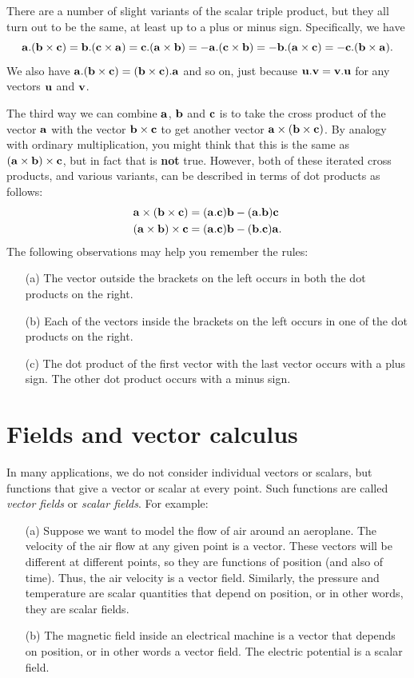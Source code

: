 \documentclass[reqno]{amsart}
\theoremstyle{definition}
\begin{document}
There are a number of slight variants of the scalar triple product,
but they all turn out to be the same, at least up to a plus or minus
sign.  Specifically, we have
\[ \mathbf{a}.(\mathbf{b}\times\mathbf{c}) = \mathbf{b}.(\mathbf{c}\times\mathbf{a}) = \mathbf{c}.(\mathbf{a}\times\mathbf{b}) = 
    -\mathbf{a}.(\mathbf{c}\times\mathbf{b}) = -\mathbf{b}.(\mathbf{a}\times\mathbf{c}) = -\mathbf{c}.(\mathbf{b}\times\mathbf{a}).
\]
We also have $\mathbf{a}.(\mathbf{b}\times\mathbf{c})=(\mathbf{b}\times\mathbf{c}).\mathbf{a}$ and so on, just because
$\mathbf{u}.\mathbf{v}=\mathbf{v}.\mathbf{u}$ for any vectors $\mathbf{u}$ and $\mathbf{v}$.

The third way we can combine $\mathbf{a}$, $\mathbf{b}$ and $\mathbf{c}$ is to take the
cross product of the vector $\mathbf{a}$ with the vector $\mathbf{b}\times\mathbf{c}$ to get
another vector $\mathbf{a}\times(\mathbf{b}\times\mathbf{c})$.  By analogy with ordinary
multiplication, you might think that this is the same as
$(\mathbf{a}\times\mathbf{b})\times\mathbf{c}$, but in fact that is \textbf{not} true.  However,
both of these iterated cross products, and various variants, can be
described in terms of dot products as follows:
\begin{align*}
 \mathbf{a}\times(\mathbf{b}\times\mathbf{c}) &= (\mathbf{a}.\mathbf{c})\mathbf{b} - (\mathbf{a}.\mathbf{b})\mathbf{c} \\
 (\mathbf{a}\times\mathbf{b})\times\mathbf{c} &= (\mathbf{a}.\mathbf{c})\mathbf{b} - (\mathbf{b}.\mathbf{c})\mathbf{a}.
\end{align*}
The following observations may help you remember the rules:
\begin{itemize}
 \item[(a)] The vector outside the brackets on the left occurs in both
  the dot products on the right.
 \item[(b)] Each of the vectors inside the brackets on the left occurs
  in one of the dot products on the right.
 \item[(c)] The dot product of the first vector with the last vector
  occurs with a plus sign.  The other dot product occurs with a minus
  sign. 
\end{itemize}

\section{Fields and vector calculus}
\label{sec-fields}

In many applications, we do not consider individual vectors or
scalars, but functions that give a vector or scalar at every point.
Such functions are called \emph{vector fields} or \emph{scalar
 fields}.  For example: 
\begin{itemize}
 \item[(a)] Suppose we want to model the flow of air around an
  aeroplane.  The velocity of the air flow at any given point is a
  vector.  These vectors will be different at different points, so
  they are functions of position (and also of time).  Thus, the air
  velocity is a vector field.  Similarly, the pressure and temperature
  are scalar quantities that depend on position, or in other words,
  they are scalar fields.
 \item[(b)] The magnetic field inside an electrical machine is a
  vector that depends on position, or in other words a vector field.
  The electric potential is a scalar field.
\end{itemize}
\end{document}
